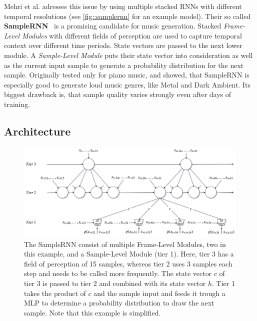 \documentclass[12pt]{article}
\begin{document}
Mehri et al. adresses this issue by using multiple stacked RNNs with different temporal resolutions (see \ref{fig::samplernn} for an example model).
Their so called \textbf{SampleRNN}~\cite{mehri2016samplernn} is a promising candidate for music generation.
Stacked \emph{Frame-Level Modules} with different fields of perception are used to capture temporal context over different time periods.
State vectors are passed to the next lower module.
A \emph{Sample-Level Module} puts their state vector into consideration as well as the current input sample to generate a probability distribution for the next sample.
Originally tested only for piano music, \cite{zukowski2018generating} and \cite{carr2018generating} showed, that SampleRNN is especially good to generate loud music genres, like Metal and Dark Ambient.
Its biggest drawback is, that sample quality varies strongly even after days of training.




\subsection{Architecture}
\begin{figure}[ht]
    \label{fig:samplernn}
    \includegraphics[width=\textwidth]{img/samplernn.png}
    \caption{The SampleRNN consist of multiple Frame-Level Modules, two in this example, and a Sample-Level Module (tier 1). Here, tier 3 has a field of perception of 15 samples, whereas tier 2 uses 3 samples each step and needs to be called more frequently. The state vector $c$ of tier 3 is passed to tier 2 and combined with its state vector $h$. Tier 1 takes the product of $c$ and the sample input and feeds it trough a MLP to determine a probability distribution to draw the next sample. Note that this example is simplified. }
\end{figure}
\end{document}
